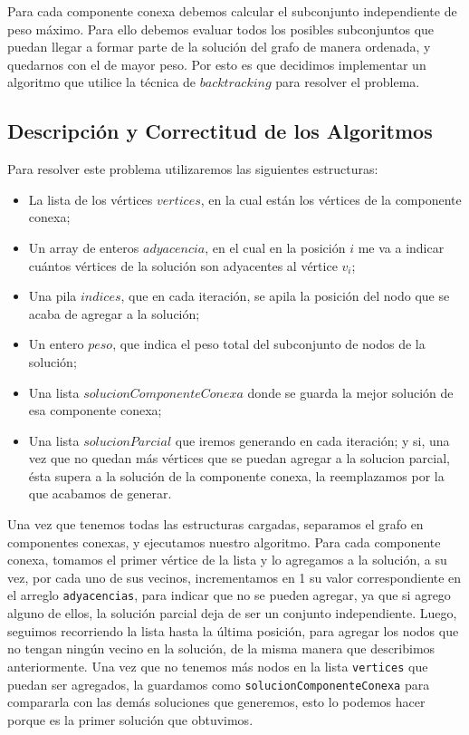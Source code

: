 \documentclass[a4paper, 10pt]{article}
\begin{document}
Para cada componente conexa debemos calcular el subconjunto independiente de peso m\'aximo. Para ello debemos evaluar todos los posibles subconjuntos que puedan llegar a formar parte de la soluci\'on del grafo de manera ordenada, y quedarnos con el de mayor peso. Por esto es que decidimos implementar un algoritmo que utilice la t\'ecnica de $backtracking$ para resolver el problema.

\subsection{Descripci\'on y Correctitud de los Algoritmos}

Para resolver este problema utilizaremos las siguientes estructuras:
\begin{itemize}
	\item La lista de los v\'ertices $vertices$, en la cual est\'an los v\'ertices de la componente conexa; 
	\item Un array de enteros $adyacencia$, en el cual en la posici\'on $i$ me va a indicar cu\'antos v\'ertices de la soluci\'on son adyacentes al v\'ertice $v_i$; 
	\item Una pila $indices$, que en cada iteraci\'on, se apila la posici\'on del nodo que se acaba de agregar a la soluci\'on;
	\item Un entero $peso$, que indica el peso total del subconjunto de nodos de la soluci\'on; 
	\item Una lista $solucionComponenteConexa$ donde se guarda la mejor soluci\'on de esa componente conexa;
	\item Una lista $solucionParcial$ que iremos generando en cada iteraci\'on; y si, una vez que no quedan m\'as v\'ertices que se puedan agregar a la solucion parcial, \'esta supera a la soluci\'on de la componente conexa, la reemplazamos por la que acabamos de generar.
\end{itemize}

Una vez que tenemos todas las estructuras cargadas, separamos el grafo en componentes conexas, y ejecutamos nuestro algoritmo. Para cada componente conexa, tomamos el primer v\'ertice de la lista y lo agregamos a la soluci\'on, a su vez, por cada uno de sus vecinos, incrementamos en 1 su valor correspondiente en el arreglo \texttt{adyacencias}, para indicar que no se pueden agregar, ya que si agrego alguno de ellos, la soluci\'on parcial deja de ser un conjunto independiente. Luego, seguimos recorriendo la lista hasta la \'ultima posici\'on, para agregar los nodos que no tengan ning\'un vecino en la soluci\'on, de la misma manera que describimos anteriormente. Una vez que no tenemos m\'as nodos en la lista \texttt{vertices} que puedan ser agregados, la guardamos como \texttt{solucionComponenteConexa} para compararla con las dem\'as soluciones que generemos, esto lo podemos hacer porque es la primer soluci\'on que obtuvimos. \\
\end{document}

